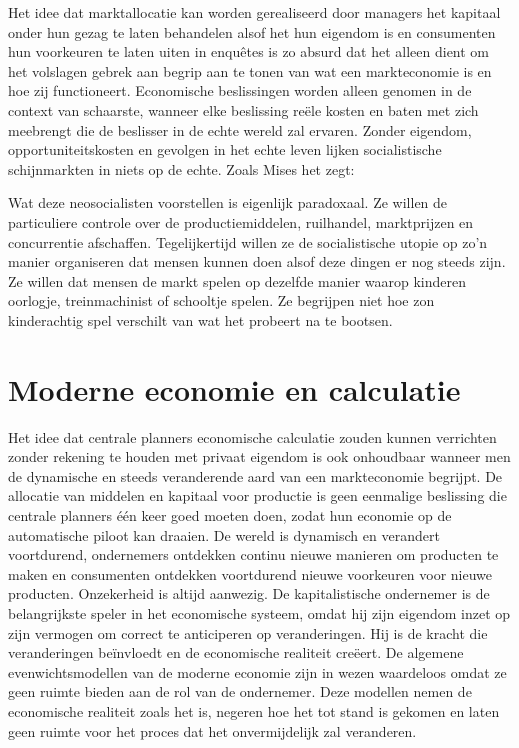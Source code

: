 Het idee dat marktallocatie kan worden gerealiseerd door managers het kapitaal onder hun gezag te laten behandelen alsof het hun eigendom is en consumenten hun voorkeuren te laten uiten in enquêtes is zo absurd dat het alleen dient om het volslagen gebrek aan begrip aan te tonen van wat een markteconomie is en hoe zij functioneert. Economische beslissingen worden alleen genomen in de context van schaarste, wanneer elke beslissing reële kosten en baten met zich meebrengt die de beslisser in de echte wereld zal ervaren. Zonder eigendom, opportuniteitskosten en gevolgen in het echte leven lijken socialistische schijnmarkten in niets op de echte. Zoals Mises het zegt:

\begin{blockquotebox}
    Wat deze neosocialisten voorstellen is eigenlijk paradoxaal. Ze willen de particuliere controle over de productiemiddelen, ruilhandel, marktprijzen en concurrentie afschaffen. Tegelijkertijd willen ze de socialistische utopie op zo'n manier organiseren dat mensen kunnen doen alsof deze dingen er nog steeds zijn. Ze willen dat mensen de markt spelen op dezelfde manier waarop kinderen oorlogje, treinmachinist of schooltje spelen. Ze begrijpen niet hoe zo\textquotesingle n kinderachtig spel verschilt van wat het probeert na te bootsen.\footnotemark
\end{blockquotebox}

\hypertarget{moderne-economie-en-berekening}{%
\section{Moderne economie en calculatie}\label{moderne-economie-en-berekening}}

Het idee dat centrale planners economische calculatie zouden kunnen verrichten zonder rekening te houden met privaat eigendom is ook onhoudbaar wanneer men de dynamische en steeds veranderende aard van een markteconomie begrijpt. De allocatie van middelen en kapitaal voor productie is geen eenmalige beslissing die centrale planners één keer goed moeten doen, zodat hun economie op de automatische piloot kan draaien. De wereld is dynamisch en verandert voortdurend, ondernemers ontdekken continu nieuwe manieren om producten te maken en consumenten ontdekken voortdurend nieuwe voorkeuren voor nieuwe producten. Onzekerheid is altijd aanwezig. De kapitalistische ondernemer is de belangrijkste speler in het economische systeem, omdat hij zijn eigendom inzet op zijn vermogen om correct te anticiperen op veranderingen. Hij is de kracht die veranderingen beïnvloedt en de economische realiteit creëert. De algemene evenwichtsmodellen van de moderne economie zijn in wezen waardeloos omdat ze geen ruimte bieden aan de rol van de ondernemer. Deze modellen nemen de economische realiteit zoals het is, negeren hoe het tot stand is gekomen en laten geen ruimte voor het proces dat het onvermijdelijk zal veranderen.

